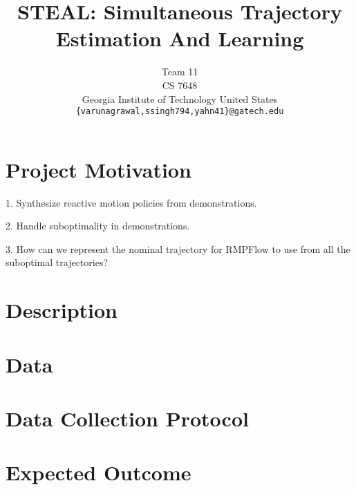 \documentclass{article}
\title{STEAL: Simultaneous Trajectory Estimation And Learning}
\author{
  Team 11\\
  CS 7648\\
  Georgia Institute of Technology
  United States\\
  \texttt{\{varunagrawal,ssingh794,yahn41\}@gatech.edu} \\
}
\begin{document}
\maketitle


\begin{abstract}

\end{abstract}



\section{Project Motivation}

1. Synthesize reactive motion policies from demonstrations.

2. Handle suboptimality in demonstrations.

3. How can we represent the nominal trajectory for RMPFlow to use from all the suboptimal trajectories?


\section{Description}


\section{Data}


\section{Data Collection Protocol}


\section{Expected Outcome}
\end{document}
